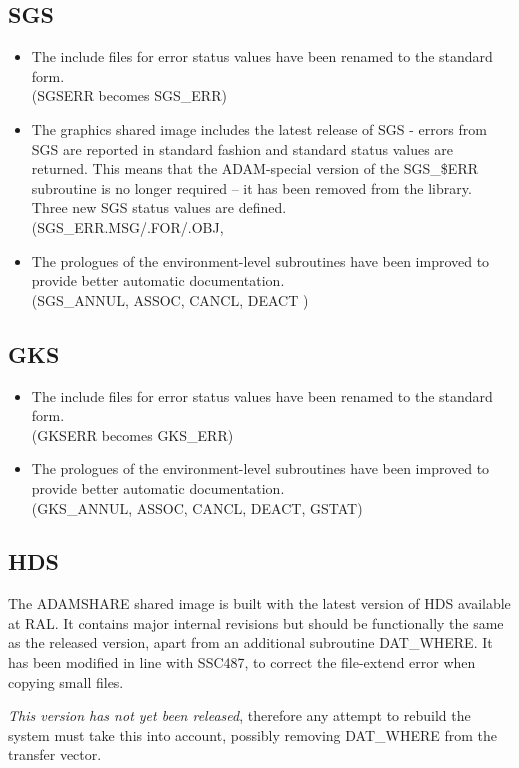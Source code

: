 \subsection{SGS}
\label{sgs}
\begin{itemize}
\item The include files for error status values have been renamed to the
standard form.\\ (SGSERR becomes SGS\_ERR)
\item The graphics shared image includes the latest release of SGS - errors from
SGS are reported in standard fashion and standard status values are returned.
This means that the ADAM-special version of the SGS\_\$ERR subroutine is no
longer required -- it has been removed from the library.
Three new SGS status values are defined.\\
(SGS\_\-ERR\-.MSG/.FOR/.OBJ, 
\item The prologues of the environment-level subroutines have been improved
to provide better automatic documentation.\\
(SGS\_\-ANNUL, ASSOC, CANCL, DEACT )
\end{itemize}

\subsection{GKS}
\label{gks}
\begin{itemize}
\item The include files for error status values have been renamed to the
standard form.\\ (GKSERR becomes GKS\_ERR)
\item The prologues of the environment-level subroutines have been improved
to provide better automatic documentation.\\
(GKS\_\-ANNUL, ASSOC, CANCL, DEACT, GSTAT)
\end{itemize}

\subsection{HDS}
\label{hds}
The ADAMSHARE shared image is built with the latest version of HDS available
at RAL. It contains major internal revisions but should be functionally the
same as the released version, apart from an additional subroutine DAT\_WHERE.
It has been modified in line with SSC487, to correct the file-extend error 
when copying small files.

{\em This version has not yet been released}, therefore any attempt to rebuild
the system must take this into account, possibly removing DAT\_WHERE from the
transfer vector.

